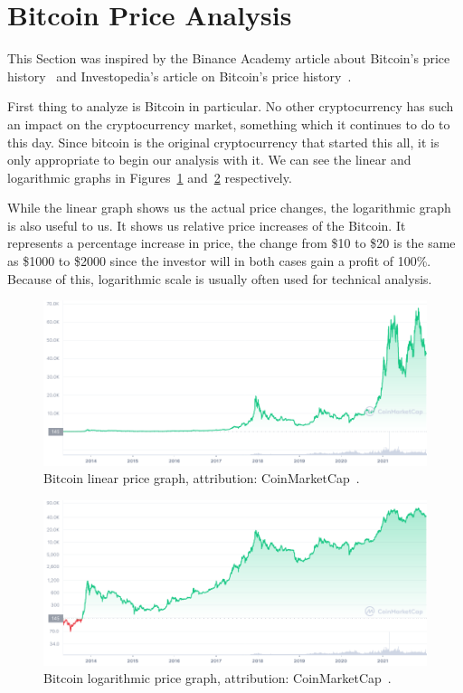 \section{Bitcoin Price Analysis}
This Section was inspired by the Binance Academy article about Bitcoin's price history~\cite{binance:bitcoin-price-history} and Investopedia's article on Bitcoin's price history~\cite{investopedia:bitcoin-price-history}.

First thing to analyze is Bitcoin in particular. No other cryptocurrency has such an impact on the cryptocurrency market, something which it continues to do to this day. Since bitcoin is the original cryptocurrency that started this all, it is only appropriate to begin our analysis with it. We can see the linear and logarithmic graphs in Figures~\ref{btc-linear-figure} and~\ref{btc-log-figure} respectively.

While the linear graph shows us the actual price changes, the logarithmic graph is also useful to us. It shows us relative price increases of the Bitcoin. It represents a percentage increase in price, the change from \$10 to \$20 is the same as \$1000 to \$2000 since the investor will in both cases gain a profit of 100\%. Because of this, logarithmic scale is usually often used for technical analysis.

\begin{figure}[!t]
    \centering
    \includegraphics[width=\columnwidth]{figures/BTC_ALL_linear.png}
    \caption{Bitcoin linear price graph, attribution: CoinMarketCap~\cite{coinmarketcap}.}
    \label{btc-linear-figure}
\end{figure}

\begin{figure}[!t]
    \centering
    \includegraphics[width=\columnwidth]{figures/BTC_ALL_log.png}
    \caption{Bitcoin logarithmic price graph, attribution: CoinMarketCap~\cite{coinmarketcap}.}
    \label{btc-log-figure}
\end{figure}

